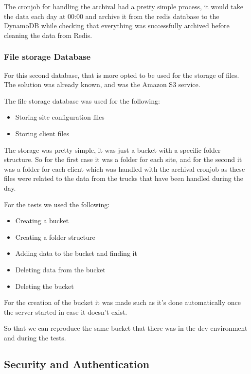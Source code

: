The cronjob for handling the archival had a pretty simple process, 
it would take the data each day at 00:00 and archive it from the redis
database to the DynamoDB while checking that everything was successfully archived
before cleaning the data from Redis.

\subsubsection {File storage Database}

For this second database, that is more opted to be used for the storage of files.
The solution was already known, and was the Amazon S3 service.

The file storage database was used for the following:

    \begin{itemize}
        \item Storing site configuration files
        \item Storing client files
    \end{itemize}

The storage was pretty simple, it was just a bucket with a specific folder structure.
So for the first case it was a folder for each site,
and for the second it was a folder for each client which was handled with the archival
cronjob as these files were related to the data from the trucks that have been handled
during the day.

For the tests we used the following:

    \begin{itemize}
        \item Creating a bucket
        \item Creating a folder structure
        \item Adding data to the bucket and finding it
        \item Deleting data from the bucket
        \item Deleting the bucket
    \end{itemize}

For the creation of the bucket it was made such as it's done automatically once the
server started in case it doesn't exist.

So that we can reproduce the same bucket that there was in the dev environment and during
the  tests.

\subsection {Security and Authentication}

